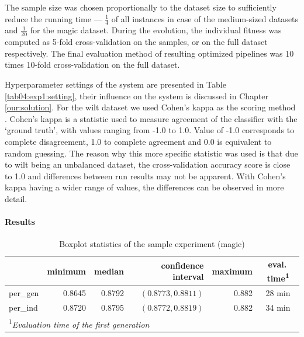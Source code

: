 The sample size was chosen proportionally to the dataset size to sufficiently
reduce the running time --- $\frac{1}{4}$ of all instances in case of the
medium-sized datasets and $\frac{1}{20}$ for the magic dataset. During the
evolution, the individual fitness was computed as 5-fold cross-validation on
the samples, or on the full dataset respectively. The final evaluation method of
resulting optimized pipelines was 10 times 10-fold cross-validation on
the full dataset.

Hyperparameter settings of the system are presented in Table
\ref{tab04:exp1:setting}, their influence on the system is discussed in Chapter
\ref{our:solution}.
For the wilt dataset we used Cohen's kappa
as the scoring method \citep{doi:10.1177/001316446002000104}. Cohen's kappa is a statistic used to measure agreement
of the classifier with the `ground truth', with values ranging from -1.0 to 1.0.
Value of -1.0 corresponds to complete disagreement, 1.0 to complete agreement
and 0.0 is equivalent to random guessing. The reason why this more specific
statistic was used is that due to wilt being an unbalanced dataset, the
cross-validation accuracy score is close to 1.0 and differences between
run results may not be apparent. With Cohen's kappa having a wider range of values,
the differences can be observed in more detail.

\paragraph{Results}

\begin{table}[ht]
\centering
\caption{Boxplot statistics of the sample experiment (magic)}\label{tab04:exp1:magboxstats}

\begin{tabular}{lrrrr|c}
\toprule
{} &  minimum &  median &  confidence interval &  maximum & eval.\,time\textsuperscript{1} \\
\midrule
per\_gen &   0.8645 &  0.8792 & $(0.8773,0.8811)$ &    0.882 & 28 min \\
per\_ind &   0.8720 &  0.8795 & $(0.8772,0.8819)$ &    0.882 & 34 min \\
\bottomrule

\multicolumn{6}{l}{\footnotesize\textsuperscript{1}\itshape Evaluation time of the first generation}

\end{tabular}

\end{table}

